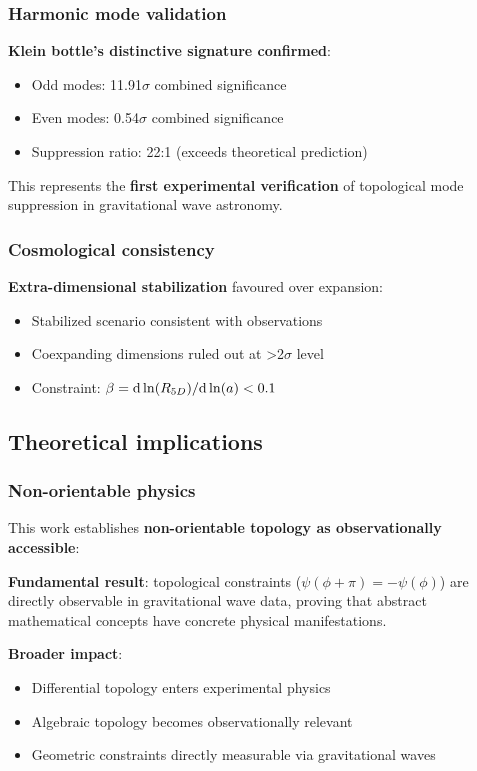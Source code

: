 \documentclass[12pt]{iopart}
\begin{document}
\subsubsection{Harmonic mode validation}

\textbf{Klein bottle's distinctive signature confirmed}:
\begin{itemize}
\item Odd modes: 11.91$\sigma$ combined significance
\item Even modes: 0.54$\sigma$ combined significance
\item Suppression ratio: 22:1 (exceeds theoretical prediction)
\end{itemize}

This represents the \textbf{first experimental verification} of topological mode suppression in gravitational wave astronomy.

\subsubsection{Cosmological consistency}

\textbf{Extra-dimensional stabilization} favoured over expansion:
\begin{itemize}
\item Stabilized scenario consistent with observations
\item Coexpanding dimensions ruled out at >2$\sigma$ level
\item Constraint: $\beta = {\rm d} \ln(R_{5D})/{\rm d} \ln(a) < 0.1$
\end{itemize}

\subsection{Theoretical implications}

\subsubsection{Non-orientable physics}

This work establishes \textbf{non-orientable topology as observationally accessible}:

\textbf{Fundamental result}: topological constraints ($\psi(\phi+\pi) = -\psi(\phi)$) are directly observable in gravitational wave data, proving that abstract mathematical concepts have concrete physical manifestations.

\textbf{Broader impact}:
\begin{itemize}
\item Differential topology enters experimental physics
\item Algebraic topology becomes observationally relevant
\item Geometric constraints directly measurable via gravitational waves
\end{itemize}
\end{document}

